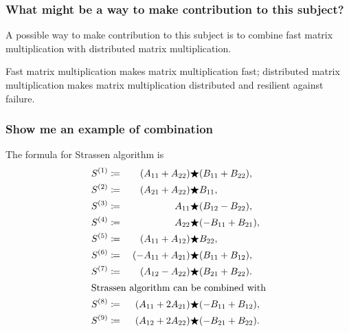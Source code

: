 \documentclass[aspectratio=169, t]{beamer}
\def\block#1#2{_{#1#2}}
\def\series#1{^{(#1)}}
\def\A{A\block}
\def\B{B\block}
\def\C{C\block}
\def\S{S\series}
\begin{document}
\begin{frame}
	\frametitle{What might be a way to make contribution to this subject?}

	A possible way to make contribution to this subject is to combine
	fast matrix multiplication with distributed matrix multiplication.

	Fast matrix multiplication makes matrix multiplication fast;
	distributed matrix multiplication makes matrix multiplication
	distributed and resilient against failure.
\end{frame}

\begin{frame}
	\frametitle{Show me an example of combination}

	The formula for Strassen algorithm is
	\def\={\coloneqq}
	\def\*{\bifstar}
	\begin{alignat*}{2}
        \S1    \= &&    (\A11 + \A22)  & \bigstar   (\B11 + \B22),  \\
        \S2    \= &&    (\A21 + \A22)  & \bigstar        \B11    ,  \\
        \S3    \= &&         \A11      & \bigstar   (\B12 - \B22),  \\
        \S4    \= &&         \A22      & \bigstar  (-\B11 + \B21),  \\
        \S5    \= &&    (\A11 + \A12)  & \bigstar        \B22    ,  \\
        \S6    \= &&   (-\A11 + \A21)  & \bigstar   (\B11 + \B12),  \\
        \S7    \=&\;&   (\A12 - \A22)  & \bigstar   (\B21 + \B22).  \\
		\intertext{Strassen algorithm can be combined with}
		\S8    \= &&   (\A11 + 2\A21)  & \bigstar  (-\B11 + \B12),  \\
		\S9    \= &&   (\A12 + 2\A22)  & \bigstar  (-\B21 + \B22).    
	\end{alignat*}
\end{frame}
\end{document}
